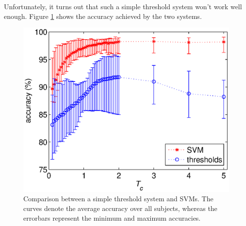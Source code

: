 \documentclass{article}
\begin{document}
Unfortunately, it turns out that such a simple threshold system won't
work well enough. Figure \ref{fig:comparison} shows the accuracy
achieved by the two systems.

\begin{figure}[htbp]
  \centering
    \includegraphics[width=\linewidth]{comparison.eps}
    \caption{Comparison between a simple threshold system and
    SVMs. The curves denote the average accuracy over all subjects,
    whereas the errorbars represent the minimum and maximum
    accuracies.}
    \label{fig:comparison}
\end{figure}
\end{document}
